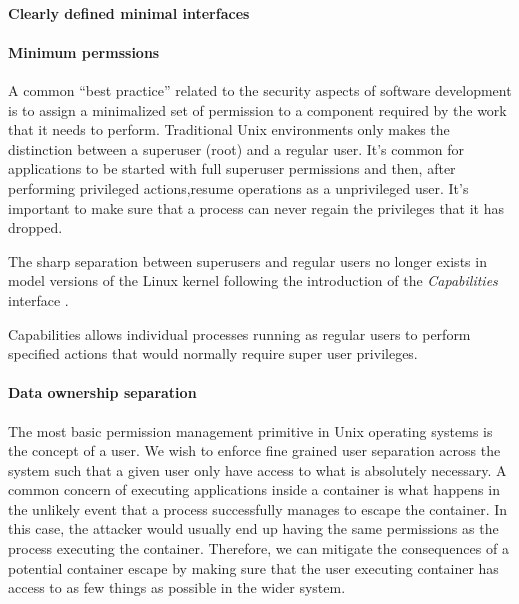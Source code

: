 \paragraph{Clearly defined minimal interfaces}


\paragraph{Minimum permssions}
\label{sec:cap}

A common "`best practice"' related to the security aspects of software
development is to assign a minimalized set of permission to a
component required by the work that it needs to perform. Traditional
Unix environments only makes the distinction between a superuser
(root) and a regular user. It's common for applications to be started
with full superuser permissions and then, after performing privileged
actions,resume operations as a unprivileged user. It's important to
make sure that a process can never regain the privileges that it has
dropped.


The sharp separation between superusers and regular users no longer
exists in model versions of the Linux kernel following the
introduction of the \textit{Capabilities} interface \cite{cap7}. 

Capabilities allows individual processes running as regular users to
perform specified actions that would normally require super user
privileges.

\paragraph{Data ownership separation}
The most basic permission management primitive in Unix operating
systems is the concept of a user. We wish to enforce fine grained user
separation across the system such that a given user only have access
to what is absolutely necessary. A common concern of executing
applications inside a container is what happens in the unlikely event
that a process successfully manages to escape the container. In this
case, the attacker would usually end up having the same permissions as
the process executing the container. Therefore, we can mitigate the
consequences of a potential container escape by making sure that the
user executing container has access to as few things as possible in
the wider system.


